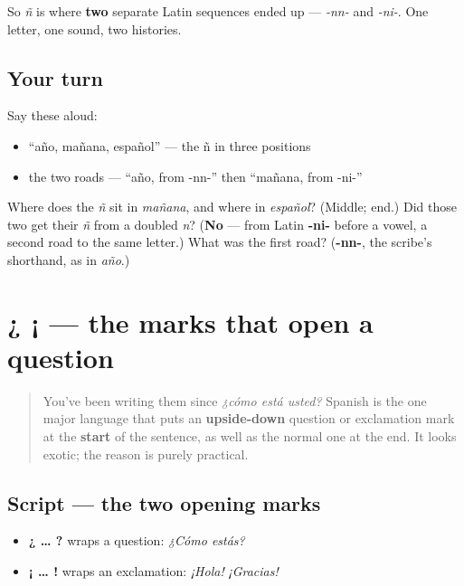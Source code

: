 So \emph{ñ} is where \textbf{two} separate Latin sequences ended up — \emph{-nn-} and \emph{-ni-}. One letter, one sound, two histories.

\subsection*{Your turn}
Say these aloud:

\begin{itemize}
\raggedright
  \item \textquotedblleft{}año, mañana, español\textquotedblright{} — the ñ in three positions
  \item the two roads — \textquotedblleft{}año, from -nn-\textquotedblright{} then \textquotedblleft{}mañana, from -ni-\textquotedblright{}
\end{itemize}

\begin{tcolorbox}[breakable,colback=teal!4,colframe=teal!35!black,title={Before you move on}]
Where does the \emph{ñ} sit in \emph{mañana}, and where in \emph{español}? (Middle; end.) Did those two get their \emph{ñ} from a doubled \emph{n}? (\textbf{No} — from Latin \textbf{-ni-} before a vowel, a second road to the same letter.) What was the first road? (\textbf{-nn-}, the scribe's shorthand, as in \emph{año}.)
\end{tcolorbox}
\section[¿ ¡]{¿ ¡ — the marks that open a question}

\label{lesson:ES-W03-inverted}



\begin{quote}
You've been writing them since \emph{¿cómo está usted?} Spanish is the one major language that puts an \textbf{upside-down} question or exclamation mark at the \textbf{start} of the sentence, as well as the normal one at the end. It looks exotic; the reason is purely practical.
\end{quote}

\subsection*{Script — the two opening marks}
\begin{itemize}
\raggedright
  \item \textbf{¿ … ?} wraps a question: \emph{¿Cómo estás?}
  \item \textbf{¡ … !} wraps an exclamation: \emph{¡Hola!} \emph{¡Gracias!}
\end{itemize}

